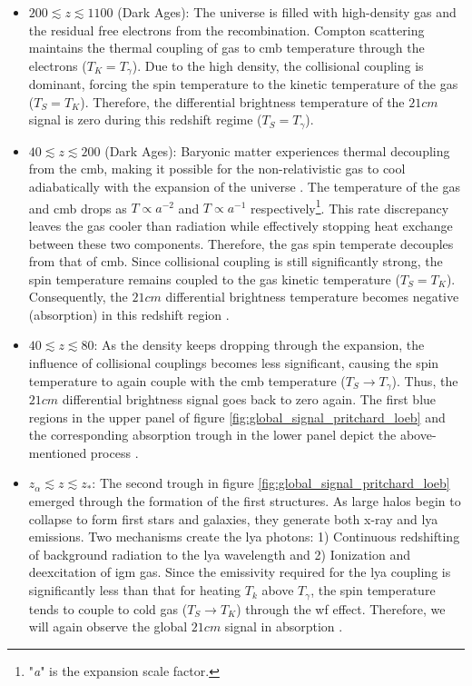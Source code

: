 \documentclass[12pt, TexShade, letterpaper]{report}
\begin{document}
\begin{itemize}
\item $200 \lesssim z \lesssim 1100$ (Dark Ages): The universe is filled with high-density gas and the residual free electrons from the recombination. Compton scattering maintains the thermal coupling of gas to \gls{cmb} temperature through the electrons ($T_K = T_\gamma$). Due to the high density, the collisional coupling is dominant, forcing the spin temperature to the kinetic temperature of the gas ($T_S = T_K$). 
Therefore, the differential brightness temperature of the $21cm$ signal is zero during this redshift regime ($T_S = T_\gamma$)\cite{21century}.\par

\item $40 \lesssim z \lesssim 200$ (Dark Ages): Baryonic matter experiences thermal decoupling from the \gls{cmb}, making it possible for the non-relativistic gas to cool adiabatically with the expansion of the universe \cite{21century}. The temperature of the gas and \gls{cmb} drops as $T\propto a^{-2}$ and $T\propto a^{-1}$ respectively\footnote{"\emph{a}" is the expansion scale factor.}. This rate discrepancy leaves the gas cooler than radiation while effectively stopping heat exchange between these two components. Therefore, the gas spin temperate decouples from that of \gls{cmb}. Since collisional coupling is still significantly strong, the spin temperature remains coupled to the gas kinetic temperature ($T_S = T_K$). Consequently, the $21cm$ differential brightness temperature becomes negative (absorption) in this redshift region \cite{map_universe, 21century}.\par

\item $40 \lesssim z \lesssim 80$: As the density keeps dropping through the expansion, the influence of collisional couplings becomes less significant, causing the spin temperature to again couple with the \gls{cmb} temperature ($T_S \rightarrow T_\gamma$). Thus, the $21cm$ differential brightness signal goes back to zero again\cite{map_universe}. The first blue regions in the upper panel of figure \ref{fig:global_signal_pritchard_loeb} and the corresponding absorption trough in the lower panel depict the above-mentioned process \cite{map_universe, 21century}.\par

\item $z_\alpha \lesssim z \lesssim z_*$: The second trough in figure \ref{fig:global_signal_pritchard_loeb} emerged through the formation of the first structures. As large halos begin to collapse to form first stars and galaxies, they generate both x-ray and \gls{lya} emissions. Two mechanisms create the \gls{lya} photons: 1) Continuous redshifting of background radiation to the \gls{lya} wavelength and 2) Ionization and deexcitation of \gls{igm} gas. Since the emissivity required for the \gls{lya} coupling is significantly less than that for heating $T_k$ above $T_\gamma$, the spin temperature tends to couple to cold gas ($T_S \rightarrow T_K$) through the \gls{wf} effect. Therefore, we will again observe the global $21cm$ signal in absorption \cite{map_universe, 21century}.\par


\end{itemize}
\end{document}
